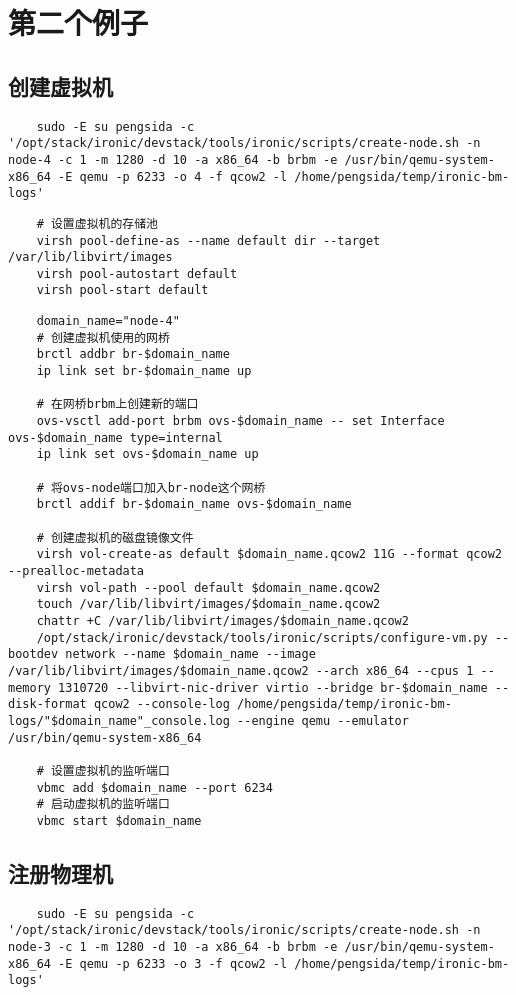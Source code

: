 \documentclass[a4paper,left=1.5cm,right=1.5cm,11pt]{article}
\begin{document}
\section{第二个例子}
\subsection{创建虚拟机}

	\begin{lstlisting}
	sudo -E su pengsida -c '/opt/stack/ironic/devstack/tools/ironic/scripts/create-node.sh -n node-4 -c 1 -m 1280 -d 10 -a x86_64 -b brbm -e /usr/bin/qemu-system-x86_64 -E qemu -p 6233 -o 4 -f qcow2 -l /home/pengsida/temp/ironic-bm-logs'
	\end{lstlisting}

	\begin{lstlisting}
	# 设置虚拟机的存储池
	virsh pool-define-as --name default dir --target /var/lib/libvirt/images
	virsh pool-autostart default
	virsh pool-start default
	\end{lstlisting}

	\begin{lstlisting}
	domain_name="node-4"
	# 创建虚拟机使用的网桥
	brctl addbr br-$domain_name
	ip link set br-$domain_name up

	# 在网桥brbm上创建新的端口
	ovs-vsctl add-port brbm ovs-$domain_name -- set Interface ovs-$domain_name type=internal
	ip link set ovs-$domain_name up

	# 将ovs-node端口加入br-node这个网桥
	brctl addif br-$domain_name ovs-$domain_name

	# 创建虚拟机的磁盘镜像文件
	virsh vol-create-as default $domain_name.qcow2 11G --format qcow2 --prealloc-metadata
	virsh vol-path --pool default $domain_name.qcow2
	touch /var/lib/libvirt/images/$domain_name.qcow2
	chattr +C /var/lib/libvirt/images/$domain_name.qcow2
	/opt/stack/ironic/devstack/tools/ironic/scripts/configure-vm.py --bootdev network --name $domain_name --image /var/lib/libvirt/images/$domain_name.qcow2 --arch x86_64 --cpus 1 --memory 1310720 --libvirt-nic-driver virtio --bridge br-$domain_name --disk-format qcow2 --console-log /home/pengsida/temp/ironic-bm-logs/"$domain_name"_console.log --engine qemu --emulator /usr/bin/qemu-system-x86_64
	
	# 设置虚拟机的监听端口
	vbmc add $domain_name --port 6234
	# 启动虚拟机的监听端口
	vbmc start $domain_name
	\end{lstlisting}
	
\subsection{注册物理机}
	\begin{lstlisting}
	sudo -E su pengsida -c '/opt/stack/ironic/devstack/tools/ironic/scripts/create-node.sh -n node-3 -c 1 -m 1280 -d 10 -a x86_64 -b brbm -e /usr/bin/qemu-system-x86_64 -E qemu -p 6233 -o 3 -f qcow2 -l /home/pengsida/temp/ironic-bm-logs'
	\end{lstlisting}
\end{document}
